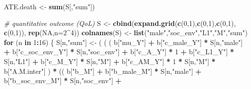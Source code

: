 \documentclass[
]{book}
\newenvironment{Shaded}{\begin{snugshade}}{\end{snugshade}}
\newcommand{\AttributeTok}[1]{\textcolor[rgb]{0.13,0.29,0.53}{#1}}
\newcommand{\CommentTok}[1]{\textcolor[rgb]{0.56,0.35,0.01}{\textit{#1}}}
\newcommand{\ConstantTok}[1]{\textcolor[rgb]{0.56,0.35,0.01}{#1}}
\newcommand{\ControlFlowTok}[1]{\textcolor[rgb]{0.13,0.29,0.53}{\textbf{#1}}}
\newcommand{\DecValTok}[1]{\textcolor[rgb]{0.00,0.00,0.81}{#1}}
\newcommand{\FunctionTok}[1]{\textcolor[rgb]{0.13,0.29,0.53}{\textbf{#1}}}
\newcommand{\NormalTok}[1]{#1}
\newcommand{\OtherTok}[1]{\textcolor[rgb]{0.56,0.35,0.01}{#1}}
\newcommand{\SpecialCharTok}[1]{\textcolor[rgb]{0.81,0.36,0.00}{\textbf{#1}}}
\newcommand{\StringTok}[1]{\textcolor[rgb]{0.31,0.60,0.02}{#1}}
\begin{document}
\begin{Shaded}
\begin{Highlighting}[]
\NormalTok{ATE.death }\OtherTok{\textless{}{-}} \FunctionTok{sum}\NormalTok{(S[,}\StringTok{"sum"}\NormalTok{])}


\CommentTok{\# quantitative outcome (QoL)}
\NormalTok{S }\OtherTok{\textless{}{-}} \FunctionTok{cbind}\NormalTok{(}\FunctionTok{expand.grid}\NormalTok{(}\FunctionTok{c}\NormalTok{(}\DecValTok{0}\NormalTok{,}\DecValTok{1}\NormalTok{),}\FunctionTok{c}\NormalTok{(}\DecValTok{0}\NormalTok{,}\DecValTok{1}\NormalTok{),}\FunctionTok{c}\NormalTok{(}\DecValTok{0}\NormalTok{,}\DecValTok{1}\NormalTok{), }\FunctionTok{c}\NormalTok{(}\DecValTok{0}\NormalTok{,}\DecValTok{1}\NormalTok{)), }\FunctionTok{rep}\NormalTok{(}\ConstantTok{NA}\NormalTok{,}\AttributeTok{n=}\DecValTok{2}\SpecialCharTok{\^{}}\DecValTok{4}\NormalTok{))}
\FunctionTok{colnames}\NormalTok{(S) }\OtherTok{\textless{}{-}} \FunctionTok{list}\NormalTok{(}\StringTok{"male"}\NormalTok{,}\StringTok{"soc\_env"}\NormalTok{,}\StringTok{"L1"}\NormalTok{,}\StringTok{"M"}\NormalTok{,}\StringTok{"sum"}\NormalTok{)}
\ControlFlowTok{for}\NormalTok{ (n }\ControlFlowTok{in} \DecValTok{1}\SpecialCharTok{:}\DecValTok{16}\NormalTok{) \{}
\NormalTok{  S[n,}\StringTok{"sum"}\NormalTok{] }\OtherTok{\textless{}{-}}\NormalTok{ ( ( ( b[}\StringTok{"mu\_Y"}\NormalTok{] }\SpecialCharTok{+} 
\NormalTok{                        b[}\StringTok{"c\_male\_Y"}\NormalTok{] }\SpecialCharTok{*}\NormalTok{ S[n,}\StringTok{"male"}\NormalTok{] }\SpecialCharTok{+} 
\NormalTok{                        b[}\StringTok{"c\_soc\_env\_Y"}\NormalTok{] }\SpecialCharTok{*}\NormalTok{ S[n,}\StringTok{"soc\_env"}\NormalTok{] }\SpecialCharTok{+}
\NormalTok{                        b[}\StringTok{"c\_A\_Y"}\NormalTok{] }\SpecialCharTok{*} \DecValTok{1} \SpecialCharTok{+}
\NormalTok{                        b[}\StringTok{"c\_L1\_Y"}\NormalTok{] }\SpecialCharTok{*}\NormalTok{ S[n,}\StringTok{"L1"}\NormalTok{] }\SpecialCharTok{+}
\NormalTok{                        b[}\StringTok{"c\_M\_Y"}\NormalTok{] }\SpecialCharTok{*}\NormalTok{ S[n,}\StringTok{"M"}\NormalTok{] }\SpecialCharTok{+} 
\NormalTok{                        b[}\StringTok{"c\_AM\_Y"}\NormalTok{] }\SpecialCharTok{*} \DecValTok{1} \SpecialCharTok{*}\NormalTok{ S[n,}\StringTok{"M"}\NormalTok{] }\SpecialCharTok{*}\NormalTok{ b[}\StringTok{"A.M.inter"}\NormalTok{] ) }\SpecialCharTok{*}
\NormalTok{                      (( b[}\StringTok{"b\_M"}\NormalTok{] }\SpecialCharTok{+} 
\NormalTok{                           b[}\StringTok{"b\_male\_M"}\NormalTok{] }\SpecialCharTok{*}\NormalTok{ S[n,}\StringTok{"male"}\NormalTok{] }\SpecialCharTok{+} 
\NormalTok{                           b[}\StringTok{"b\_soc\_env\_M"}\NormalTok{] }\SpecialCharTok{*}\NormalTok{ S[n,}\StringTok{"soc\_env"}\NormalTok{] }\SpecialCharTok{+} 

\end{Highlighting}
\end{Shaded}
\end{document}
